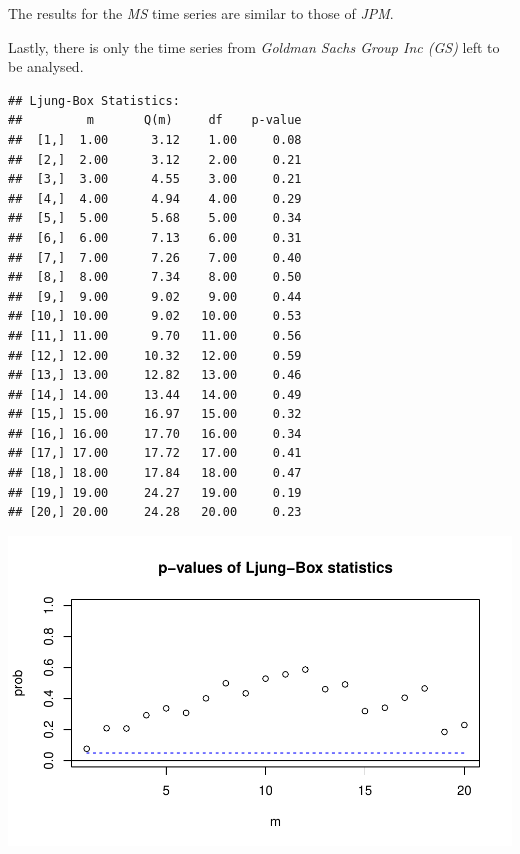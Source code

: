 \documentclass[12pt,a4paper]{article}
\newenvironment{Shaded}{\begin{snugshade}}{\end{snugshade}}
\newcommand{\DataTypeTok}[1]{\textcolor[rgb]{0.13,0.29,0.53}{#1}}
\newcommand{\DecValTok}[1]{\textcolor[rgb]{0.00,0.00,0.81}{#1}}
\newcommand{\KeywordTok}[1]{\textcolor[rgb]{0.13,0.29,0.53}{\textbf{#1}}}
\newcommand{\NormalTok}[1]{#1}
\newcommand{\OperatorTok}[1]{\textcolor[rgb]{0.81,0.36,0.00}{\textbf{#1}}}
\begin{document}
The results for the \emph{MS} time series are similar to those of
\emph{JPM}.

Lastly, there is only the time series from \emph{Goldman Sachs Group Inc
(GS)} left to be analysed.

\begin{Shaded}
\end{Shaded}

\begin{verbatim}
## Ljung-Box Statistics:  
##         m       Q(m)     df    p-value
##  [1,]  1.00      3.12    1.00     0.08
##  [2,]  2.00      3.12    2.00     0.21
##  [3,]  3.00      4.55    3.00     0.21
##  [4,]  4.00      4.94    4.00     0.29
##  [5,]  5.00      5.68    5.00     0.34
##  [6,]  6.00      7.13    6.00     0.31
##  [7,]  7.00      7.26    7.00     0.40
##  [8,]  8.00      7.34    8.00     0.50
##  [9,]  9.00      9.02    9.00     0.44
## [10,] 10.00      9.02   10.00     0.53
## [11,] 11.00      9.70   11.00     0.56
## [12,] 12.00     10.32   12.00     0.59
## [13,] 13.00     12.82   13.00     0.46
## [14,] 14.00     13.44   14.00     0.49
## [15,] 15.00     16.97   15.00     0.32
## [16,] 16.00     17.70   16.00     0.34
## [17,] 17.00     17.72   17.00     0.41
## [18,] 18.00     17.84   18.00     0.47
## [19,] 19.00     24.27   19.00     0.19
## [20,] 20.00     24.28   20.00     0.23
\end{verbatim}

\includegraphics{exercise_1_files/figure-latex/unnamed-chunk-5-1.pdf}
\end{document}
